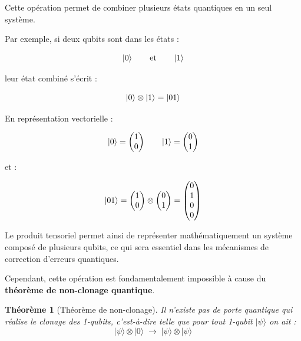 \documentclass[a4paper,12pt]{article}
\newtheorem{theorem}{Théorème}
\begin{document}
Cette opération permet de combiner plusieurs états quantiques en un seul système.

Par exemple, si deux qubits sont dans les états :

\[
\ket{0}
\qquad
\text{et}
\qquad
\ket{1}
\]

leur état combiné s’écrit :

\[
\ket{0}\otimes\ket{1}
=
\ket{01}
\]

En représentation vectorielle :

\[
\ket{0}
=
\begin{pmatrix}
1\\
0
\end{pmatrix}
\qquad
\ket{1}
=
\begin{pmatrix}
0\\
1
\end{pmatrix}
\]

et :

\[
\ket{01}
=
\begin{pmatrix}
1\\
0
\end{pmatrix}
\otimes
\begin{pmatrix}
0\\
1
\end{pmatrix}
=
\begin{pmatrix}
0\\
1\\
0\\
0
\end{pmatrix}
\]

Le produit tensoriel permet ainsi de représenter mathématiquement un système composé de plusieurs qubits, ce qui sera essentiel dans les mécanismes de correction d’erreurs quantiques.

Cependant, cette opération est fondamentalement impossible à cause du \textbf{théorème de non-clonage quantique}.

\begin{theorem}[Théorème de non-clonage]
Il n'existe pas de porte quantique qui réalise le clonage des 1-qubits, 
c'est-à-dire telle que pour tout 1-qubit $|\psi\rangle$ on ait :
\[
|\psi\rangle \otimes |0\rangle \;\longrightarrow\; |\psi\rangle \otimes |\psi\rangle
\]
\end{theorem}
\end{document}
